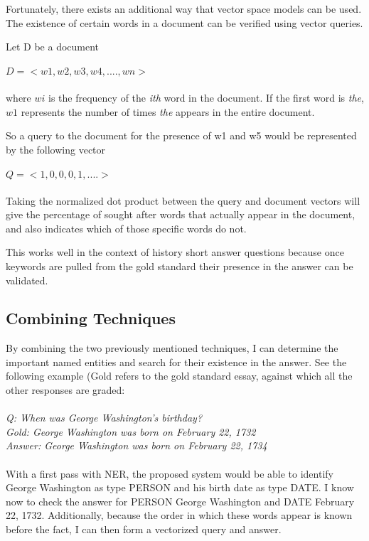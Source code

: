 Fortunately, there exists an additional way that vector space models can be used. The existence of certain words in a document can be verified using vector queries.

Let D be a document\\\\ $D = <w1, w2, w3, w4, ...., wn>$\\\\ where $wi$ is the frequency of the \textit{ith} word in the document. If the first word is \textit{the}, $w1$ represents the number of times \textit{the} appears in the entire document.

So a query to the document for the presence of w1 and w5 would be represented by the following vector 
\\\\
$Q=<1, 0, 0, 0, 1, ....>$
\\\\
Taking the normalized dot product between the query and document vectors will give the percentage of sought after words that actually appear in the document, and also indicates which of those specific words do not.

This works well in the context of history short answer questions because once keywords are pulled from the gold standard their presence in the answer can be validated.

\subsection{Combining Techniques}
By combining the two previously mentioned techniques, I can determine the important named entities and search for their existence in the answer. See the following example (Gold refers to the gold standard essay, against which all the other responses are graded:
\\\\
\textit{Q: When was George Washington's birthday?}\\
\textit{Gold: George Washington was born on February 22, 1732}\\
\textit{Answer: George Washington was born on February 22, 1734}
\\\\
With a first pass with NER, the proposed system would be able to identify George Washington as type PERSON and his birth date as type DATE. I know now to check the answer for PERSON George Washington and DATE February 22, 1732. Additionally, because the order in which these words appear is known before the fact, I can then form a vectorized query and answer.

